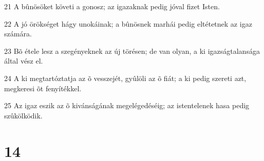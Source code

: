 \par 21 A bûnösöket követi a gonosz; az igazaknak pedig jóval fizet Isten.
\par 22 A jó örökséget hágy unokáinak; a bûnösnek marhái pedig eltétetnek az igaz számára.
\par 23 Bõ étele lesz a szegényeknek az új törésen; de van olyan, a ki igazságtalansága által vész el.
\par 24 A ki megtartóztatja az õ vesszejét, gyûlöli az õ fiát; a ki pedig szereti azt, megkeresi õt fenyítékkel.
\par 25 Az igaz eszik az õ kivánságának megelégedéséig; az istentelenek hasa pedig szûkölködik.

\chapter{14}

